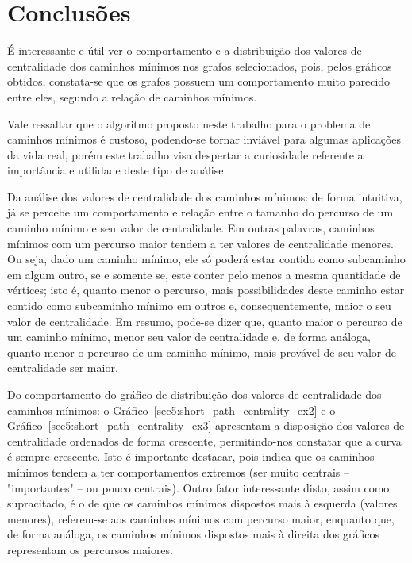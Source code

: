 \chapter{Conclusões}
É interessante e útil ver o comportamento e a distribuição dos valores de centralidade dos caminhos mínimos nos grafos selecionados, pois, pelos gráficos obtidos, constata-se que os grafos possuem um comportamento muito parecido entre eles, segundo a relação de caminhos mínimos.

Vale ressaltar que o algoritmo proposto neste trabalho para o problema de caminhos mínimos é custoso, podendo-se tornar inviável para algumas aplicações da vida real, porém este trabalho visa despertar a curiosidade referente a importância e utilidade deste tipo de análise.

Da análise dos valores de centralidade dos caminhos mínimos: de forma intuitiva, já se percebe um comportamento e relação entre o tamanho do percurso de um caminho mínimo e seu valor de centralidade. Em outras palavras, caminhos mínimos com um percurso maior tendem a ter valores de centralidade menores. Ou seja, dado um caminho mínimo, ele só poderá estar contido como subcaminho em algum outro, se e somente se, este conter pelo menos a mesma quantidade de vértices; isto é, quanto menor o percurso, mais possibilidades deste caminho estar contido como subcaminho mínimo em outros e, consequentemente, maior o seu valor de centralidade. Em resumo, pode-se dizer que, quanto maior o percurso de um caminho mínimo, menor seu valor de centralidade e, de forma análoga, quanto menor o percurso de um caminho mínimo, mais provável de seu valor de centralidade ser maior.

Do comportamento do gráfico de distribuição dos valores de centralidade dos caminhos mínimos: o Gráfico~\ref{sec5:short_path_centrality_ex2} e o Gráfico~\ref{sec5:short_path_centrality_ex3} apresentam a disposição dos valores de centralidade ordenados de forma crescente, permitindo-nos constatar que a curva é sempre crescente. Isto é importante destacar, pois indica que os caminhos mínimos tendem a ter comportamentos extremos (ser muito centrais -- "importantes" -- ou pouco centrais). Outro fator interessante disto, assim como supracitado, é o de que os caminhos mínimos dispostos mais à esquerda (valores menores), referem-se aos caminhos mínimos com percurso maior, enquanto que, de forma análoga, os caminhos mínimos dispostos mais à direita dos gráficos representam os percursos maiores.

